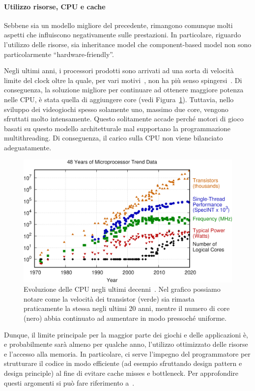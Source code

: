 \paragraph{Utilizzo risorse, CPU e cache}
Sebbene sia un modello migliore del precedente, rimangono comunque molti aspetti che influiscono negativamente sulle prestazioni. In particolare, riguardo l'utilizzo delle risorse, sia inheritance model che component-based model non sono particolarmente ``hardware-friendly''.

Negli ultimi anni, i processori prodotti sono arrivati ad una sorta di velocità limite del clock oltre la quale, per vari motivi~\cite{article:cpu-speed-cap}, non ha più senso spingersi~\cite{article:cpu-evolution}. Di conseguenza, la soluzione migliore per continuare ad ottenere maggiore potenza nelle CPU, è stata quella di aggiungere core (vedi Figura~\ref{fig:cpu-evolution}). Tuttavia, nello sviluppo dei videogiochi spesso solamente uno, massimo due core, vengono sfruttati molto intensamente. Questo solitamente accade perché motori di gioco basati su questo modello architetturale mal supportano la programmazione multithreading. Di conseguenza, il carico sulla CPU non viene bilanciato adeguatamente.

\begin{figure}[!ht]
    \centering
    \includegraphics[width=0.95\columnwidth]{gfx/imgs/chapter1/CPUEvolution.png}
    \caption{Evoluzione delle CPU negli ultimi decenni~\cite{repo:cpu-evolution-data}. Nel grafico possiamo notare come la velocità dei transistor (verde) sia rimasta praticamente la stessa negli ultimi 20 anni, mentre il numero di core (nero) abbia continuato ad aumentare in modo pressoché uniforme.}
    \label{fig:cpu-evolution}
\end{figure}

Dunque, il limite principale per la maggior parte dei giochi e delle applicazioni è, e probabilmente sarà almeno per qualche anno, l'utilizzo ottimizzato delle risorse e l'accesso alla memoria. In particolare, ci serve l'impegno del programmatore per strutturare il codice in modo efficiente (ad esempio sfruttando design pattern e design principle) al fine di evitare cache misses e bottleneck. Per approfondire questi argomenti si può fare riferimento a~\cite{article:drepper2007every}.

